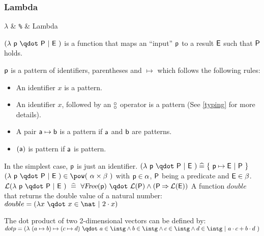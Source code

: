 \begin{samepage}
\subsubsection{Lambda}
\label{lambda}
\begin{rrnames}
  $\lambda$  & \texttt{\%}  & Lambda
\end{rrnames}
\begin{rodinrefentry}
  \rrdesc
    $(\lambda~\exprlp~\qdot~\predp~|~\expre~)$ is a function that maps an ``input'' $\textsf{p}$ to
    a result $\textsf{E}$ such that $\textsf{P}$ holds. 

    $\textsf{p}$ is a pattern of identifiers, parentheses and $\mapsto$ which follows the
    following rules:
    \begin{itemize}
    \item An identifier $x$ is a pattern.
    \item An identifier $x$, followed by an $\boftype$ operator is a pattern (See \ref{typing}
      for more details).
    \item A pair $\textsf{a}\mapsto\textsf{b}$ is a pattern if $\textsf{a}$ and $\textsf{b}$ are patterns.
    \item $(\textsf{a})$ is pattern if $\textsf{a}$ is pattern.
    \end{itemize}
    In the simplest case, $\textsf{p}$ is just an identifier.
  \rrdef
    $(\lambda~\exprlp~\qdot~\predp~|~\expre~) \defi \{~\exprlp\mapsto \expre~|~\predp~\}$
  \rrtypes
    $(\lambda~\exprlp~\qdot~\predp~|~\expre~)\in\pow(~\alpha\cprod\beta~)$
    with $\textsf{p}\in\alpha$, $\textsf{P}$ being a predicate and $\textsf{E}\in\beta$.
  \rrwd
    $\wdl(\lambda~\exprlp~\qdot~\predp~|~\expre~)~\defi~
    \forall \freeids{\exprlp}~\qdot~\wdl(\predp)\land (\predp\limp \wdl(\expre))$
  \rrex
    A function $double$ that returns the double value of a natural number:\\
    $double = (\lambda x~\qdot~x\in\nat~|~2\cdot x)$

    The dot product of two 2-dimensional vectors can be defined by:\\
    $dotp = (\lambda~(a \mapsto b)\mapsto(c \mapsto d)~\qdot~a\in\intg\land  b\in\intg\land  c\in\intg\land  d\in\intg~|~a\cdot c+b\cdot d~)$
\end{rodinrefentry}
\end{samepage}
\clearpage

